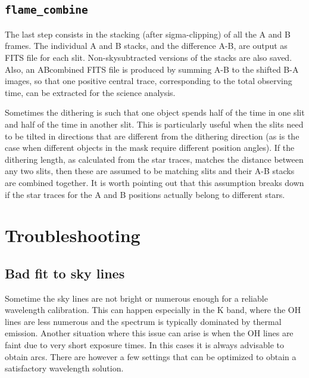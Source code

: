 \documentclass[a4paper, notitlepage]{article}
\begin{document}
\subsection{\texttt{flame\_combine}}

The last step consists in the stacking (after sigma-clipping) of all the A and B frames. The individual A and B stacks, and the difference A-B, are output as FITS file for each slit. Non-skysubtracted versions of the stacks are also saved. Also, an ABcombined FITS file is produced by summing A-B to the shifted B-A images, so that one positive central trace, corresponding to the total observing time, can be extracted for the science analysis.

Sometimes the dithering is such that one object spends half of the time in one slit and half of the time in another slit. This is particularly useful when the slits need to be tilted in directions that are different from the dithering direction (as is the case when different objects in the mask require different position angles). If the dithering length, as calculated from the star traces, matches the distance between any two slits, then these are assumed to be matching slits and their A-B stacks are combined together. It is worth pointing out that this assumption breaks down if the star traces for the A and B positions actually belong to different stars.





\section{Troubleshooting}

\subsection{Bad fit to sky lines}

Sometime the sky lines are not bright or numerous enough for a reliable wavelength calibration. This can happen especially in the K band, where the OH lines are less numerous and the spectrum is typically dominated by thermal emission. Another situation where this issue can arise is when the OH lines are faint due to very short exposure times. In this cases it is always advisable to obtain arcs. There are however a few settings that can be optimized to obtain a satisfactory wavelength solution.
\end{document}
